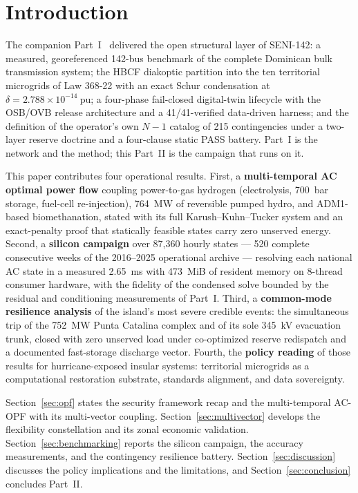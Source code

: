 \section{Introduction}
\label{sec:intro}

The companion Part~I~\cite{seni142part1} delivered the open structural layer of SENI-142: a measured, georeferenced 142-bus benchmark of the complete Dominican bulk transmission system; the HBCF diakoptic partition into the ten territorial microgrids of Law 368-22 with an exact Schur condensation at $\delta = 2.788 \times 10^{-14}\ \mathrm{pu}$; a four-phase fail-closed digital-twin lifecycle with the OSB/OVB release architecture and a 41/41-verified data-driven harness; and the definition of the operator's own $N-1$ catalog of 215 contingencies under a two-layer reserve doctrine and a four-clause static PASS battery. Part~I is the network and the method; this Part~II is the campaign that runs on it.

This paper contributes four operational results. First, a \textbf{multi-temporal AC optimal power flow} coupling power-to-gas hydrogen (electrolysis, 700~bar storage, fuel-cell re-injection), 764~MW of reversible pumped hydro, and ADM1-based biomethanation, stated with its full Karush--Kuhn--Tucker system and an exact-penalty proof that statically feasible states carry zero unserved energy. Second, a \textbf{silicon campaign} over 87,360 hourly states --- 520 complete consecutive weeks of the 2016--2025 operational archive --- resolving each national AC state in a measured 2.65~ms with 473~MiB of resident memory on 8-thread consumer hardware, with the fidelity of the condensed solve bounded by the residual and conditioning measurements of Part~I. Third, a \textbf{common-mode resilience analysis} of the island's most severe credible events: the simultaneous trip of the 752~MW Punta Catalina complex and of its sole 345~kV evacuation trunk, closed with zero unserved load under co-optimized reserve redispatch and a documented fast-storage discharge vector. Fourth, the \textbf{policy reading} of those results for hurricane-exposed insular systems: territorial microgrids as a computational restoration substrate, standards alignment, and data sovereignty.

Section~\ref{sec:opf} states the security framework recap and the multi-temporal AC-OPF with its multi-vector coupling. Section~\ref{sec:multivector} develops the flexibility constellation and its zonal economic validation. Section~\ref{sec:benchmarking} reports the silicon campaign, the accuracy measurements, and the contingency resilience battery. Section~\ref{sec:discussion} discusses the policy implications and the limitations, and Section~\ref{sec:conclusion} concludes Part~II.
